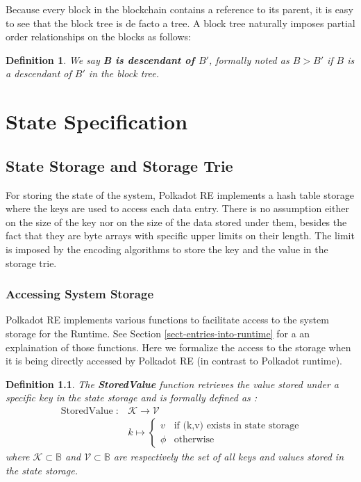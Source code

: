 \documentclass{book}
\newcommand{\tmop}[1]{\ensuremath{\operatorname{#1}}}
\newcommand{\tmstrong}[1]{\textbf{#1}}
\newcommand{\tmtextbf}[1]{{\bfseries{#1}}}
\newtheorem{definition}{Definition}
\providecommand{\tmop}[1]{\ensuremath{\mathrm{#1}}}
\providecommand{\tmstrong}[1]{\tmtextbf{#1}}
\providecommand{\tmtextbf}[1]{\tmtextbf{#1}}
\newtheorem{definition}{Definition}
\begin{document}
Because every block in the blockchain contains a reference to its parent, it
is easy to see that the block tree is de facto a tree. A block tree naturally
imposes partial order relationships on the blocks as follows:

\begin{definition}
  We say {\tmstrong{B is descendant of $B'$}}, formally noted as {\tmstrong{$B
  > B'$}} if $B$ is a descendant of $B'$ in the block tree.
\end{definition}

\chapter{State Specification}\label{chap-state-spec}

\section{State Storage and Storage Trie}\label{sect-state-storage}

For storing the state of the system, Polkadot RE implements a hash table
storage where the keys are used to access each data entry. There is no
assumption either on the size of the key nor on the size of the data stored
under them, besides the fact that they are byte arrays with specific upper
limits on their length. The limit is imposed by the encoding algorithms to
store the key and the value in the storage trie.

\subsection{Accessing System Storage }

Polkadot RE implements various functions to facilitate access to the system
storage for the Runtime. See Section \ref{sect-entries-into-runtime} for a an
explaination of those functions. Here we formalize the access to the storage
when it is being directly accessed by Polkadot RE (in contrast to Polkadot
runtime).

\begin{definition}
  \label{defn-stored-value}The \label{autolab24}{\tmstrong{StoredValue}}
  function retrieves the value stored under a specific key in the state
  storage and is formally defined as :
  \[ \begin{array}{cc}
       \tmop{StoredValue} : & \mathcal{K} \rightarrow \mathcal{V}\\
       & k \mapsto \left\{ \begin{array}{cc}
         v & \text{if (k,v) exists in state storage}\\
         \phi & \tmop{otherwise}
       \end{array} \right.
     \end{array} \]
  where $\mathcal{K} \subset \mathbb{B}$ and $\mathcal{V} \subset \mathbb{B}$
  are respectively the set of all keys and values stored in the state storage.
  
  \ 
\end{definition}
\end{document}
